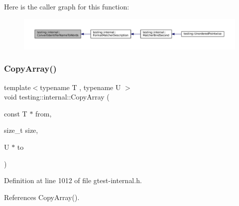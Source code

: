 Here is the caller graph for this function\+:
\nopagebreak
\begin{figure}[H]
\begin{center}
\leavevmode
\includegraphics[width=350pt]{namespacetesting_1_1internal_a571db854f6de337007c53573c9cbf8a3_icgraph}
\end{center}
\end{figure}
\mbox{\label{namespacetesting_1_1internal_afb1b9728aaaf6d9fe6246a19cfe3f7f5}} 
\subsubsection{\texorpdfstring{Copy\+Array()}{CopyArray()}\hspace{0.1cm}{\footnotesize\ttfamily [1/3]}}
{\footnotesize\ttfamily template$<$typename T , typename U $>$ \\
void testing\+::internal\+::\+Copy\+Array (\begin{DoxyParamCaption}\item[{const T $\ast$}]{from,  }\item[{size\+\_\+t}]{size,  }\item[{U $\ast$}]{to }\end{DoxyParamCaption})}



Definition at line 1012 of file gtest-\/internal.\+h.



References Copy\+Array().


